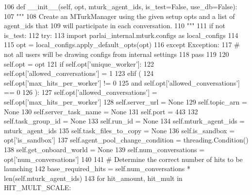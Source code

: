 \begin{DoxyCode}
106     \textcolor{keyword}{def }\_\_init\_\_(self, opt, mturk\_agent\_ids, is\_test=False, use\_db=False):
107         \textcolor{stringliteral}{"""}
108 \textcolor{stringliteral}{        Create an MTurkManager using the given setup opts and a list of agent\_ids that}
109 \textcolor{stringliteral}{        will participate in each conversation.}
110 \textcolor{stringliteral}{        """}
111         \textcolor{keywordflow}{if} \textcolor{keywordflow}{not} is\_test:
112             \textcolor{keywordflow}{try}:
113                 \textcolor{keyword}{import} parlai\_internal.mturk.configs \textcolor{keyword}{as} local\_configs
114 
115                 opt = local\_configs.apply\_default\_opts(opt)
116             \textcolor{keywordflow}{except} Exception:
117                 \textcolor{comment}{# not all users will be drawing configs from internal settings}
118                 \textcolor{keywordflow}{pass}
119 
120         self.opt = opt
121         \textcolor{keywordflow}{if} self.opt[\textcolor{stringliteral}{'unique\_worker'}]:
122             self.opt[\textcolor{stringliteral}{'allowed\_conversations'}] = 1
123         \textcolor{keywordflow}{elif} (
124             self.opt[\textcolor{stringliteral}{'max\_hits\_per\_worker'}] != 0
125             \textcolor{keywordflow}{and} self.opt[\textcolor{stringliteral}{'allowed\_conversations'}] == 0
126         ):
127             self.opt[\textcolor{stringliteral}{'allowed\_conversations'}] = self.opt[\textcolor{stringliteral}{'max\_hits\_per\_worker'}]
128         self.server\_url = \textcolor{keywordtype}{None}
129         self.topic\_arn = \textcolor{keywordtype}{None}
130         self.server\_task\_name = \textcolor{keywordtype}{None}
131         self.port = 443
132         self.task\_group\_id = \textcolor{keywordtype}{None}
133         self.run\_id = \textcolor{keywordtype}{None}
134         self.mturk\_agent\_ids = mturk\_agent\_ids
135         self.task\_files\_to\_copy = \textcolor{keywordtype}{None}
136         self.is\_sandbox = opt[\textcolor{stringliteral}{'is\_sandbox'}]
137         self.agent\_pool\_change\_condition = threading.Condition()
138         self.get\_onboard\_world = \textcolor{keywordtype}{None}
139         self.num\_conversations = opt[\textcolor{stringliteral}{'num\_conversations'}]
140 
141         \textcolor{comment}{# Determine the correct number of hits to be launching}
142         base\_required\_hits = self.num\_conversations * len(self.mturk\_agent\_ids)
143         \textcolor{keywordflow}{for} hit\_amount, hit\_mult \textcolor{keywordflow}{in} HIT\_MULT\_SCALE:

\end{DoxyCode}
